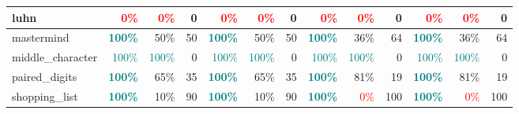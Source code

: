 \begin{table}[!h]
{\begin{tabular}{|p{2.9cm}|rr|r|rr|r||rr|r|rr|r|}
		luhn               & \textcolor{red}{0\%}                 & \multicolumn{1}{r|}{\textcolor{red}{0\%}}             & \cellcolor[HTML]{FFFFFF}0    & \textcolor{red}{0\%}             & \multicolumn{1}{r|}{\textcolor{red}{0\%}}             & \cellcolor[HTML]{FFFFFF}0    & \textcolor{red}{0\%}                 & \multicolumn{1}{r|}{\textcolor{red}{0\%}}    & \cellcolor[HTML]{FFFFFF}0    & \textcolor{red}{0\%}             & \multicolumn{1}{r|}{\textcolor{red}{0\%}}             & \cellcolor[HTML]{FFFFFF}0    \\ \hline
		mastermind         & \textcolor{teal}{\textbf{100\%}}     & \multicolumn{1}{r|}{50\%}                             & \cellcolor[HTML]{FFCC80}50   & \textcolor{teal}{\textbf{100\%}} & \multicolumn{1}{r|}{50\%}                             & \cellcolor[HTML]{FFCC80}50   & \textcolor{teal}{\textbf{100\%}}     & \multicolumn{1}{r|}{36\%}                    & \cellcolor[HTML]{FFBE5C}64   & \textcolor{teal}{\textbf{100\%}} & \multicolumn{1}{r|}{36\%}                             & \cellcolor[HTML]{FFBE5C}64   \\ \hline
		middle\_character  & \textcolor{teal}{100\%}              & \multicolumn{1}{r|}{\textcolor{teal}{100\%}}          & \cellcolor[HTML]{FFFFFF}0    & \textcolor{teal}{100\%}          & \multicolumn{1}{r|}{\textcolor{teal}{100\%}}          & \cellcolor[HTML]{FFFFFF}0    & \textcolor{teal}{100\%}              & \multicolumn{1}{r|}{\textcolor{teal}{100\%}} & \cellcolor[HTML]{FFFFFF}0    & \textcolor{teal}{100\%}          & \multicolumn{1}{r|}{\textcolor{teal}{100\%}}          & \cellcolor[HTML]{FFFFFF}0    \\ \hline
		paired\_digits     & \textcolor{teal}{\textbf{100\%}}     & \multicolumn{1}{r|}{65\%}                             & \cellcolor[HTML]{FFDCA6}35   & \textcolor{teal}{\textbf{100\%}} & \multicolumn{1}{r|}{65\%}                             & \cellcolor[HTML]{FFDCA6}35   & \textcolor{teal}{\textbf{100\%}}     & \multicolumn{1}{r|}{81\%}                    & \cellcolor[HTML]{FFECCF}19   & \textcolor{teal}{\textbf{100\%}} & \multicolumn{1}{r|}{81\%}                             & \cellcolor[HTML]{FFECCF}19   \\ \hline
		shopping\_list     & \textcolor{teal}{\textbf{100\%}}     & \multicolumn{1}{r|}{10\%}                             & \cellcolor[HTML]{FFA41A}90   & \textcolor{teal}{\textbf{100\%}} & \multicolumn{1}{r|}{10\%}                             & \cellcolor[HTML]{FFA41A}90   & \textcolor{teal}{\textbf{100\%}}     & \multicolumn{1}{r|}{\textcolor{red}{0\%}}    & \cellcolor[HTML]{FF9900}100  & \textcolor{teal}{\textbf{100\%}} & \multicolumn{1}{r|}{\textcolor{red}{0\%}}             & \cellcolor[HTML]{FF9900}100  \\ \hline

\end{tabular}}
\end{table}
